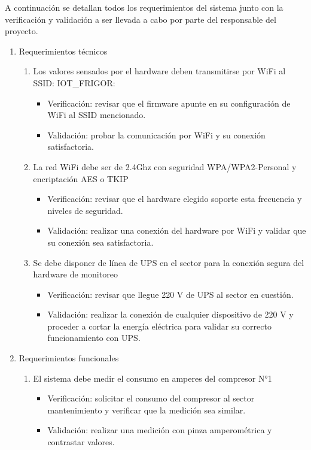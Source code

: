 \documentclass[
11pt, %
]{charter}
\begin{document}
A continuación se detallan todos los requerimientos del sistema junto con la verificación y validación a ser llevada a cabo por parte del responsable del proyecto.
\begin{enumerate}
	\item Requerimientos técnicos
		\begin{enumerate}
			\item Los valores sensados por el hardware deben transmitirse por WiFi al SSID: IOT\_FRIGOR:
			\begin{itemize}
				\item Verificación: revisar que el firmware apunte en su configuración de WiFi al SSID mencionado.
				\item Validación: probar la comunicación por WiFi y su conexión satisfactoria.
			\end{itemize}
			\item La red WiFi debe ser de 2.4Ghz con seguridad WPA/WPA2-Personal y encriptación AES o TKIP
			\begin{itemize}
				\item Verificación: revisar que el hardware elegido soporte esta frecuencia y niveles de seguridad.
				\item Validación: realizar una conexión del hardware por WiFi y validar que su conexión sea satisfactoria.
			\end{itemize}
			\item Se debe disponer de línea de UPS en el sector para la conexión segura del hardware de monitoreo
			\begin{itemize}
				\item Verificación: revisar que llegue 220 V de UPS al sector en cuestión.
				\item Validación: realizar la conexión de cualquier dispositivo de 220 V y proceder a cortar la energía eléctrica para validar su correcto funcionamiento con UPS.
			\end{itemize}
		\end{enumerate}
	\item Requerimientos funcionales
		\begin{enumerate}
			\item El sistema debe medir el consumo en amperes del compresor N°1
			\begin{itemize}
				\item Verificación: solicitar el consumo del compresor al sector mantenimiento y verificar que la medición sea similar.
				\item Validación: realizar una medición con pinza amperométrica y contrastar valores.

\end{itemize}
\end{enumerate}
\end{enumerate}
\end{document}
